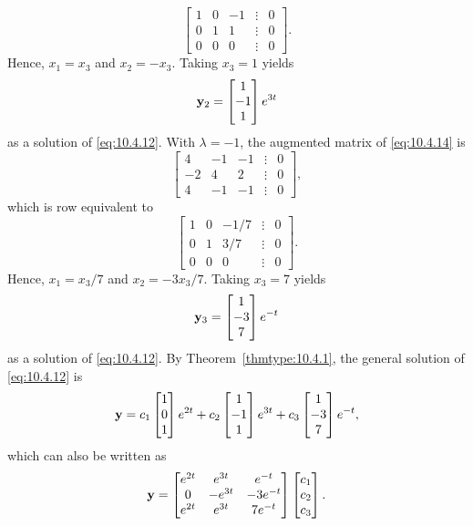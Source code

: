 \documentclass{ximera}
\begin{document}
\begin{example}
\begin{explanation}
$$
\begin{bmatrix} 1&0&-1&\vdots&0\\0&1&1&
\vdots&0\\0&0&0&\vdots&0\end{bmatrix}.
$$
Hence,  $x_1=x_3$ and $x_2=-x_3$. Taking $x_3=1$ yields
$$
{\bf y}_2=\begin{bmatrix}1\\-1\\1\end{bmatrix}e^{3t}
$$
as a solution of  \eqref{eq:10.4.12}.  With $\lambda=-1$, the augmented
matrix of  \eqref{eq:10.4.14} is
$$
\begin{bmatrix} 4&-1&-1&\vdots&0\\-2&4&
2&\vdots&0\\4&-1&-1&\vdots&0
\end{bmatrix},
$$
which is row equivalent to
$$
\begin{bmatrix} 1&0&-1/7&\vdots&0\\0&1&
3/7&\vdots&0\\0&0&0&\vdots&0\end{bmatrix}.
$$
Hence, $x_1=x_3/7$ and $x_2=-3x_3/7$.  Taking $x_3=7$ yields
$$
{\bf y}_3=\begin{bmatrix}1\\-3\\7\end{bmatrix}e^{-t}
$$
as a solution of  \eqref{eq:10.4.12}. By Theorem~\ref{thmtype:10.4.1},
 the general solution of  \eqref{eq:10.4.12} is
$$
{\bf y}=c_1\begin{bmatrix}1\\0\\1\end{bmatrix}e^{2t}
+c_2\begin{bmatrix}1\\-1\\1\end{bmatrix}
e^{3t}+c_3
\begin{bmatrix}1\\-3\\7\end{bmatrix}e^{-t},
$$
which can also be written as
\begin{equation}\label{eq:10.4.15}
{\bf y}=\begin{bmatrix}e^{2t}&e^{3t}&e^{-t}
\\0&-e^{3t}&
-3e^{-t}\\e^{2t}&e^{3t}&7e^{-t}\end{bmatrix}\begin{bmatrix} c_1\\c_2\\c_3\end{bmatrix}.
\end{equation}


\end{explanation}
\end{example}
\end{document}
